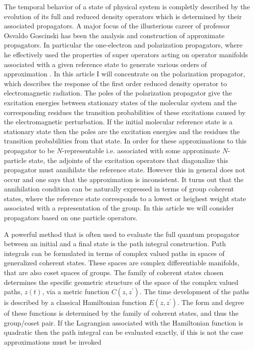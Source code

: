 \documentclass[aps,preprint]{revtex4}%
\begin{document}
The temporal behavior of a state of physical system is completly described by
the evolution of its full and reduced density operators which is determined by
their associated propagators. A major focus of the illusterious career of
professor Osvaldo Goscinski has been the analysis and construction of
approximate propagators. In particular the one-electron and polarization
propagators, where he effectively used the properties of super operators
acting on operator manifolds associated with a given reference state to
generate various orders of approximation \cite{Osvaldo}. In this article I
will concentrate on the polarization propagator, which describes the response
of the first order reduced density operator to electromagnetic radiation. The
poles of the polarization propagator give the excitation energies between
stationary states of the molecular system and the corresponding residues the
transition probabilities of these excitations caused by the electromagnetic
perturbation. If the initial molecular reference state is a stationary state
then the poles are the excitation energies and the residues the transition
probabilities from that state. In order for these approximations to this
propagator to be $N$-representable i.e. associated with some approximate
$N$-particle state, the adjoints of the excitation operators that diagonalize
this propagator must annihilate the reference state. However this in general
does not occur and one says that the approximation is inconsistent. It turns
out that the annihilation condition can be naturally expressed in terms of
group coherent states, where the reference state corresponds to a lowest or
heighest weight state associated with a representation of the group. In this
article we will consider propagators based on one particle operators.

A powerful method that is often used to evaluate the full quantum propagator
between an initial and a final state is the path integral construction. Path
integrals can be formulated in terms of complex valued paths in spaces of
generalized coherent states. These spaces are complex differentiable
manifolds, that are also coset spaces of groups. The family of coherent states
chosen determines the specific geometric structure of the space of the complex
valued paths, $z(t)$, via a metric function $C\left(  z,z^{\prime}\right)  $.
The time development of the paths is described by a classical Hamiltonian
function $E\left(  z,z^{\prime}\right)  $. The form and degree of these
functions is determined by the family of coherent states, and thus the
group/coset pair. If the Lagrangian associated with the Hamiltonian function
is quadratic then the path integral can be evaluated exactly, if this is not
the case approximations must be invoked
\end{document}

